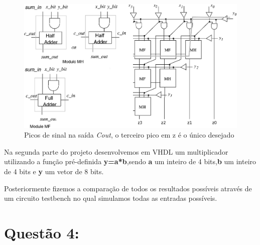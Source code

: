 \documentclass[10pt, letterpaper]{article}
\numberwithin{table}{section}
\numberwithin{figure}{section}
\begin{document}
\begin{figure}[h!]
\begin{centering}
\includegraphics[scale=0.7]{q3a.eps}
\par\end{centering}
\caption{Picos de sinal na sa\'ida \emph{Cout}, o terceiro pico em z é o \'unico desejado}
\end{figure}
 
Na segunda parte do projeto desenvolvemos em VHDL um multiplicador utilizando a função pré-definida {\bf y=a*b},sendo {\bf a} um inteiro de 4 bits,{\bf b} um inteiro de 4 bits e {\bf y} um vetor de 8 bits.

Posteriormente fizemos a comparação de todos os resultados possíveis através de um circuito testbench no qual simulamos todas as entradas possíveis. 
\newpage


\newpage


\newpage



\newpage
\section{Quest\~ao 4:}


\hspace{0.5cm}
\end{document}
